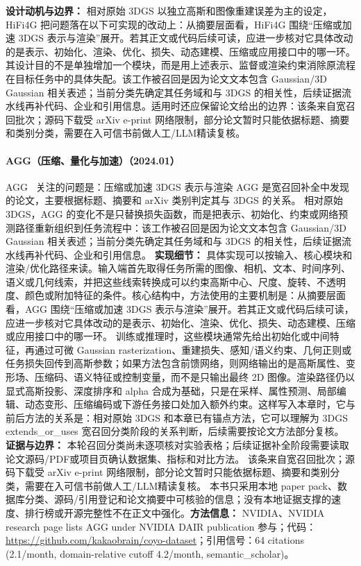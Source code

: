 \textbf{设计动机与边界：} 相对原始 3DGS 以独立高斯和图像重建误差为主的设定，HiFi4G 把问题落在以下可实现的改动上：从摘要层面看，HiFi4G 围绕“压缩或加速 3DGS 表示与渲染”展开。若其正文或代码后续可读，应进一步核对它具体改动的是表示、初始化、渲染、优化、损失、动态建模、压缩或应用接口中的哪一环。其设计目的不是单独增加一个模块，而是用上述表示、监督或渲染约束消除原流程在目标任务中的具体失配。该工作被召回是因为论文文本包含 Gaussian/3D Gaussian 相关表述；当前分类先确定其任务域和与 3DGS 的相关性，后续证据流水线再补代码、企业和引用信息。适用时还应保留论文给出的边界：该条来自宽召回批次；源码下载受 arXiv e-print 网络限制，部分论文暂时只能依据标题、摘要和类别分类，需要在入可信书前做人工/LLM精读复核。
\paragraph{AGG（压缩、量化与加速）（2024.01）}
AGG~\cite{2401_04099} 关注的问题是：压缩或加速 3DGS 表示与渲染 AGG 是宽召回补全中发现的论文，主要根据标题、摘要和 arXiv 类别判定其与 3DGS 的关系。
相对原始 3DGS，AGG 的变化不是只替换损失函数，而是把表示、初始化、约束或网络预测路径重新组织到任务流程中：该工作被召回是因为论文文本包含 Gaussian/3D Gaussian 相关表述；当前分类先确定其任务域和与 3DGS 的相关性，后续证据流水线再补代码、企业和引用信息。
\textbf{实现细节：} 具体实现可以按输入、核心模块和渲染/优化路径来读。输入端首先取得任务所需的图像、相机、文本、时间序列、语义或几何线索，并把这些线索转换成可以约束高斯中心、尺度、旋转、不透明度、颜色或附加特征的条件。核心结构中，方法使用的主要机制是：从摘要层面看，AGG 围绕“压缩或加速 3DGS 表示与渲染”展开。若其正文或代码后续可读，应进一步核对它具体改动的是表示、初始化、渲染、优化、损失、动态建模、压缩或应用接口中的哪一环。 训练或推理时，这些模块通常先给出初始化或中间特征，再通过可微 Gaussian rasterization、重建损失、感知/语义约束、几何正则或任务损失回传到高斯参数；如果方法包含前馈网络，则网络输出的是高斯属性、变形场、压缩码、语义特征或控制变量，而不是只输出最终 2D 图像。渲染路径仍以显式高斯投影、深度排序和 alpha 合成为基础，只是在采样、属性预测、局部编辑、动态变形、压缩编码或下游任务接口处加入额外约束。这样写入本章时，它与前后方法的关系是：相对原始 3DGS 和本章已有锚点方法，它可以理解为 3DGS extends\_or\_uses 宽召回分类阶段的关系判断，后续需要按论文方法部分复核。
\textbf{证据与边界：} 本轮召回分类尚未逐项核对实验表格；后续证据补全阶段需要读取论文源码/PDF或项目页确认数据集、指标和对比方法。 该条来自宽召回批次；源码下载受 arXiv e-print 网络限制，部分论文暂时只能依据标题、摘要和类别分类，需要在入可信书前做人工/LLM精读复核。 本书只采用本地 paper pack、数据库分类、源码/引用登记和论文摘要中可核验的信息；没有本地证据支撑的速度、排行榜或开源完整性不在正文中强化。\textbf{方法信息：} NVIDIA、NVIDIA research page lists AGG under NVIDIA DAIR publication 参与；代码：\url{https://github.com/kakaobrain/coyo-dataset}；引用信号：64 citations (2.1/month, domain-relative cutoff 4.2/month, semantic\_scholar)。

